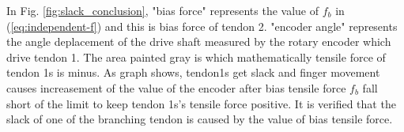 \documentclass{llncs}
\begin{document}
In Fig. \ref{fig:slack_conclusion}, "bias force" represents the value of $f_b$ in (\ref{eq:independent-f}) and this is bias force of tendon 2.
"encoder angle" represents the angle deplacement of the drive shaft measured by the rotary encoder which drive tendon 1.
The area painted gray is which mathematically tensile force of tendon 1s is minus.
As graph shows, tendon1s get slack and finger movement causes increasement of the value of the encoder after bias tensile force $f_b$ fall short of the limit to keep tendon 1s's tensile force positive.
It is verified that the slack of one of the branching tendon is caused by the value of bias tensile force.

	

\end{document}
